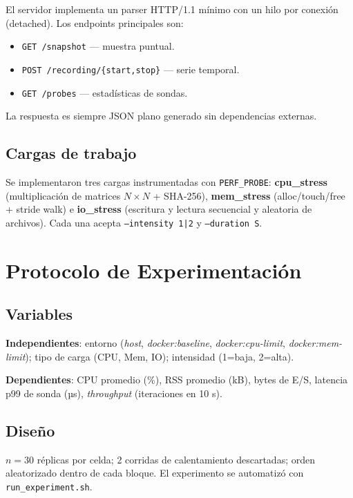 \documentclass[conference]{IEEEtran}
\begin{document}
El servidor implementa un parser HTTP/1.1 mínimo con un hilo por conexión
(detached). Los endpoints principales son:

\begin{itemize}
  \item \texttt{GET /snapshot} — muestra puntual.
  \item \texttt{POST /recording/\{start,stop\}} — serie temporal.
  \item \texttt{GET /probes} — estadísticas de sondas.
\end{itemize}

La respuesta es siempre JSON plano generado sin dependencias externas.

\subsection{Cargas de trabajo}

Se implementaron tres cargas instrumentadas con \texttt{PERF\_PROBE}:
\textbf{cpu\_stress} (multiplicación de matrices $N \times N$ + SHA-256),
\textbf{mem\_stress} (alloc/touch/free + stride walk) e
\textbf{io\_stress} (escritura y lectura secuencial y aleatoria de archivos).
Cada una acepta \texttt{--intensity 1|2} y \texttt{--duration S}.

\section{Protocolo de Experimentación}

\subsection{Variables}

\textbf{Independientes}: entorno (\textit{host}, \textit{docker:baseline},
\textit{docker:cpu-limit}, \textit{docker:mem-limit}); tipo de carga (CPU,
Mem, IO); intensidad (1=baja, 2=alta).

\textbf{Dependientes}: CPU promedio (\%), RSS promedio (kB), bytes de E/S,
latencia p99 de sonda (µs), \textit{throughput} (iteraciones en 10 s).

\subsection{Diseño}

$n = 30$ réplicas por celda; 2 corridas de calentamiento descartadas;
orden aleatorizado dentro de cada bloque. El experimento se automatizó con
\texttt{run\_experiment.sh}.
\end{document}
